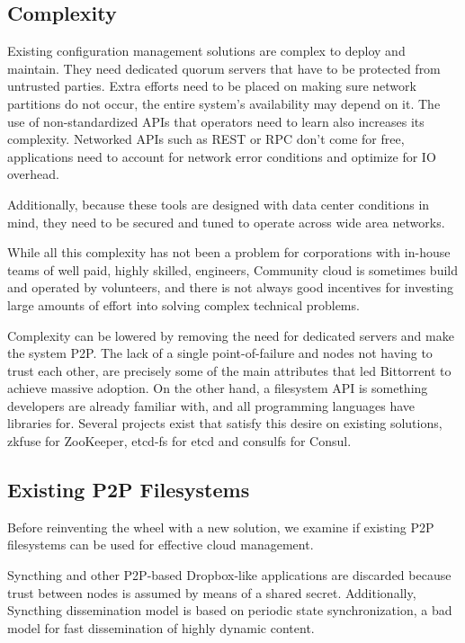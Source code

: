 \documentclass{sig-alternate}
\begin{document}
\subsection{Complexity}

Existing configuration management solutions are complex to deploy and maintain. They need dedicated quorum servers that have to be protected from untrusted parties. Extra efforts need to be placed on making sure network partitions do not occur, the entire system's availability may depend on it. The use of non-standardized APIs that operators need to learn also increases its complexity. Networked APIs such as REST or RPC don't come for free, applications need to account for network error conditions and optimize for IO overhead.

Additionally, because these tools are designed with data center conditions in mind, they need to be secured and tuned to operate across wide area networks.

While all this complexity has not been a problem for corporations with in-house teams of well paid, highly skilled, engineers, Community cloud is sometimes build and operated by volunteers, and there is not always good incentives for investing large amounts of effort into solving complex technical problems.

Complexity can be lowered by removing the need for dedicated servers and make the system P2P. The lack of a single point-of-failure and nodes not having to trust each other, are precisely some of the main attributes that led Bittorrent to achieve massive adoption. On the other hand, a filesystem API is something developers are already familiar with, and all programming languages have libraries for. Several projects exist that satisfy this desire on existing solutions, zkfuse \cite{zkfuse} for ZooKeeper, etcd-fs \cite{etcd-fs} for etcd and consulfs \cite{consulfs} for Consul.

\subsection{Existing P2P Filesystems}

Before reinventing the wheel with a new solution, we examine if existing P2P filesystems can be used for effective cloud management.

Syncthing\cite{syncthing} and other P2P-based Dropbox-like applications are discarded because trust between nodes is assumed by means of a shared secret. Additionally, Syncthing dissemination model is based on periodic state synchronization, a bad model for fast dissemination of highly dynamic content.
\end{document}
